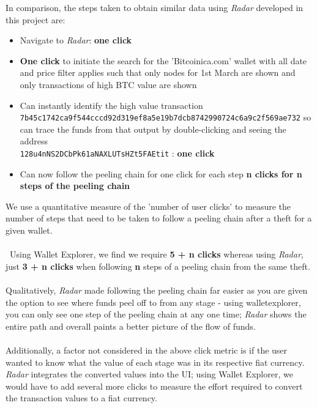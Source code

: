 In comparison, the steps taken to obtain similar data using \textit{Radar} developed in this project are:
\begin{itemize}
    \item Navigate to \textit{Radar}: \textbf{one click}
    \item \textbf{One click} to initiate the search for the 'Bitcoinica.com' wallet with all date and price filter applies such that only nodes for 1st March are shown and only transactions of high BTC value are shown 
    \item Can instantly identify the high value transaction \\\texttt{7b45c1742ca9f544cccd92d319ef8a5e19b7dcb8742990724c6a9c2f569ae732} so can trace the funds from that output by double-clicking and seeing the address \\\texttt{128u4nNS2DCbPk61aNAXLUTsHZt5FAEtit} : \textbf{one click}
    \item Can now follow the peeling chain for one click for each step \textbf{n clicks for n steps of the peeling chain}
\end{itemize}
We use a quantitative measure of the 'number of user clicks' to measure the number of steps that need to be taken to follow a peeling chain after a theft for a given wallet. 
\\\\\
Using Wallet Explorer, we find we require \textbf{5 + n clicks} whereas using \textit{Radar}, just \textbf{3 + n clicks} when following \textbf{n} steps of a peeling chain from the same theft.
\\\\
Qualitatively, \textit{Radar} made following the peeling chain far easier as you are given the option to see where funds peel off to from any stage - using walletexplorer, you can only see one step of the peeling chain at any one time; \textit{Radar} shows the entire path and overall paints a better picture of the flow of funds. 
\\\\
Additionally, a factor not considered in the above click metric is if the user wanted to know what the value of each stage was in its respective fiat currency. \textit{Radar} integrates the converted values into the UI; using Wallet Explorer, we would have to add several more clicks to measure the effort required to convert the transaction values to a fiat currency.


